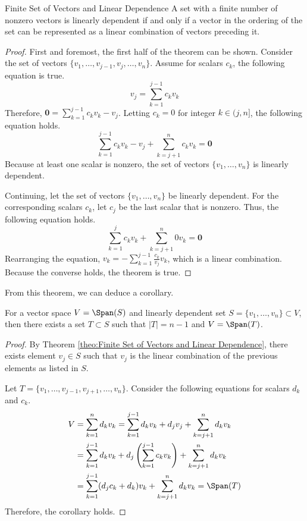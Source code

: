\documentclass[../main.tex]{subfiles}
\begin{document}
\begin{theorem}{Finite Set of Vectors and Linear Dependence}
A set with a finite number of nonzero vectors is linearly dependent
if and only if a vector in the ordering of the set can be represented
as a linear combination of vectors preceding it.
\end{theorem}
\begin{proof}
First and foremost, the first half of the theorem can be shown.
Consider the set of vectors $\{ v_1, \ldots, v_{j-1}, v_j, \ldots,
v_n \}$. Assume for scalars $c_k$, the following equation is true.
\[
v_j
= \sum_{k = 1}^{j-1} c_k v_k
\]
Therefore, $\mathbf{0} = \sum_{k = 1}^{j-1} c_k v_k - v_j$.
Letting $c_k = 0$ for integer $k \in (j, n]$, the following equation
holds.
\[
\sum_{k = 1}^{j-1} c_k v_k - v_j + \sum_{k = j+1}^{n} c_k v_k
= \mathbf{0}
\]
Because at least one scalar is nonzero, the set of vectors $\{ v_1,
\ldots, v_n \}$ is linearly dependent.

Continuing, let the set of vectors $\{ v_1, \ldots, v_n \}$ be
linearly dependent. For the corresponding scalars $c_k$, let
$c_j$ be the last scalar that is nonzero. Thus, the following
equation holds.
\[
\sum_{k = 1}^{j} c_k v_k + \sum_{k = j+1}^{n} 0 v_k
= \mathbf{0}
\]
Rearranging the equation, $v_k = -\sum_{k = 1}^{j-1} \frac{c_k}{v_j}
v_k$, which is a linear combination. Because the converse holds,
the theorem is true.
\end{proof}

From this theorem, we can deduce a corollary.

\begin{corollary}{}
For a vector space $V = \Span(S)$ and linearly dependent set
$S = \{ v_1, \ldots, v_n \} \subset V$, then there exists a set
$T \subset S$ such that $|T| = n - 1$ and $V = \Span(T)$.
\end{corollary}
\begin{proof}
By Theorem \ref{theo:Finite Set of Vectors and Linear Dependence},
there exists element $v_j \in S$ such that $v_j$ is the linear
combination of the previous elements as listed in $S$.

Let $T = \{ v_1, \ldots, v_{j-1}, v_{j+1}, \ldots, v_n \}$.
Consider the following equations for scalars $d_k$ and $c_k$.
\begin{align*}
    V
    &= \sum_{k = 1}^n d_k v_k
    = \sum_{k = 1}^{j-1} d_k v_k + d_j v_j +
        \sum_{k = j+1}^n d_k v_k \\
    &= \sum_{k = 1}^{j-1} d_k v_k +
        d_j \left( \sum_{k = 1}^{j-1} c_k v_k \right) +
        \sum_{k = j+1}^n d_k v_k \\
    &= \sum_{k = 1}^{j-1} (d_j c_k + d_k) v_k +
        \sum_{k = j+1}^n d_k v_k
    = \Span(T)
\end{align*}
Therefore, the corollary holds.
\end{proof}
\end{document}
